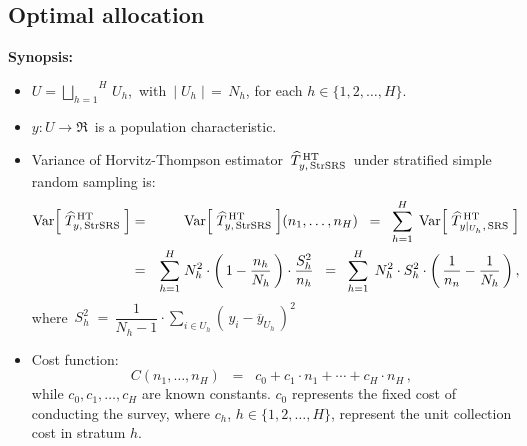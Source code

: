 

\subsection{Optimal allocation}

\vskip 0.2cm
\noindent
\textbf{Synopsis:}
\begin{itemize}
\item
	\vskip -0.2cm
	$U = \overset{H}{\underset{h=1}{\bigsqcup}}\,U_{h}$,\, with
	\,$\vert\;U_{h}\;\vert \,=\, N_{h}$, for each $h \in \{1,2,\ldots,H\}$.
\item
	$y : U \longrightarrow \Re$\, is a population characteristic.
\item
	Variance of Horvitz-Thompson estimator
	\,$\widehat{T}^{\,\textnormal{HT}}_{y,\,\textnormal{StrSRS}}$\,
	under stratified simple random sampling is:
	\begin{eqnarray*}
	\textnormal{Var}\!\left[\;\widehat{T}^{\,\textnormal{HT}}_{y,\,\textnormal{StrSRS}}\;\right]
	& = &
		\textnormal{Var}\!\left[\;\widehat{T}^{\,\textnormal{HT}}_{y,\,\textnormal{StrSRS}}\;\right]\!(n_{1},\ldots,n_{H})
	\;\; = \;\;
		\overset{H}{\underset{h=1}{\sum}}\;\,
		\textnormal{Var}\!\left[\;\widehat{T}^{\,\textnormal{HT}}_{y\vert_{U_{h}},\,\textnormal{SRS}}\;\right]
	\\
	& = &
		\overset{H}{\underset{h=1}{\sum}}\;
		N_{h}^{2}
		\cdot
		\left(\,1 - \dfrac{n_{h}}{N_{h}}\,\right)
		\cdot
		\dfrac{S_{h}^{2}}{n_{h}}
	\;\; = \;\;
		\overset{H}{\underset{h=1}{\sum}}\;\,
		N_{h}^{2} \cdot S_{h}^{2}
		\cdot
		\left(\,\dfrac{1}{n_{n}} - \dfrac{1}{N_{h}}\,\right),
	\end{eqnarray*}
	where
	\,$S_{h}^{2}
	\; = \,
	\dfrac{1}{N_{h}-1}\cdot\underset{i \in U_{h}}{\sum}\!\left(\,y_{i}-\overline{y}_{U_{h}}\,\right)^{2}$\,
\item
	Cost function:
	\begin{equation*}
	C(n_{1},\ldots,n_{H})
	\;\; = \;\;
		c_{0} + c_{1} \cdot n_{1} + \cdots + c_{H} \cdot n_{H}\,,
	\end{equation*}
	while $c_{0}, c_{1}, \ldots, c_{H}$ are known constants.
	$c_{0}$ represents the fixed cost of conducting the survey,
	where $c_{h}$, $h \in \{1,2,\ldots,H\}$, represent the unit collection cost in stratum $h$. 
\end{itemize}


